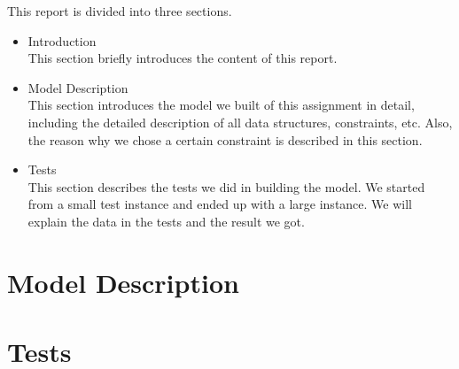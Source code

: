 \documentclass[a4paper, 12pt]{article}
\begin{document}
This report is divided into three sections. 
\begin{itemize}
	\item Introduction \\
		This section briefly introduces the content of this report. 
	\item Model Description \\
		This section introduces the model we built of this assignment in detail, including the detailed description of all data structures, constraints, etc. Also, the reason why we chose a certain constraint is described in this section. 
	\item Tests \\
		This section describes the tests we did in building the model. We started from a small test instance and ended up with a large instance. We will explain the data in the tests and the result we got. 
\end{itemize}

\newpage

\section{Model Description}

\newpage

\section{Tests}
\end{document}
